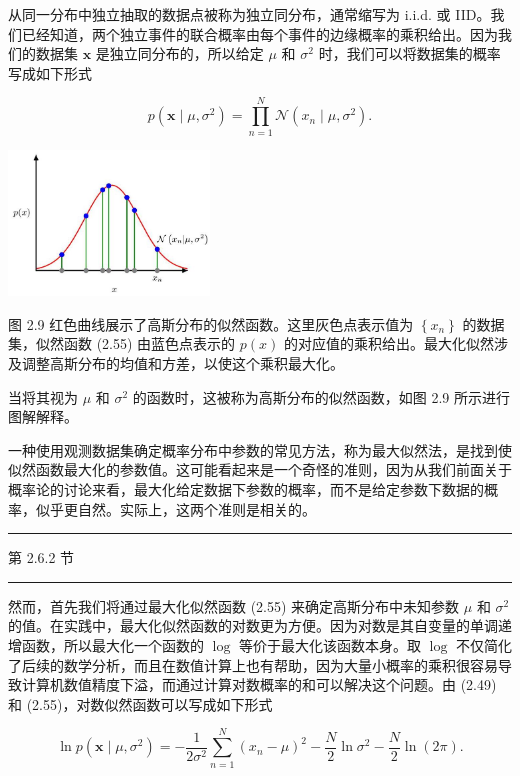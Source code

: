 \documentclass[10pt]{report}
\newcommand{\HRule}{\begin{center}\rule{0.9\linewidth}{0.2mm}\end{center}}
\begin{document}
从同一分布中独立抽取的数据点被称为独立同分布，通常缩写为 i.i.d. 或 IID。我们已经知道，两个独立事件的联合概率由每个事件的边缘概率的乘积给出。因为我们的数据集 \(\mathbf{x}\) 是独立同分布的，所以给定 \(\mu\) 和 \({\sigma }^{2}\) 时，我们可以将数据集的概率写成如下形式

\[
p\left( {\mathbf{x} \mid  \mu ,{\sigma }^{2}}\right)  = \mathop{\prod }\limits_{{n = 1}}^{N}\mathcal{N}\left( {{x}_{n} \mid  \mu ,{\sigma }^{2}}\right) . \tag{2.55}
\]

\begin{center}
\includegraphics[max width=0.4\textwidth]{images/0194e279-9b28-703a-88f4-c3ac21e2010d_57_941_344_607_442_0.jpg}
\end{center}
\hspace*{3em} 

图 2.9 红色曲线展示了高斯分布的似然函数。这里灰色点表示值为 \(\left\{  {x}_{n}\right\}\) 的数据集，似然函数 (2.55) 由蓝色点表示的 \(p\left( x\right)\) 的对应值的乘积给出。最大化似然涉及调整高斯分布的均值和方差，以使这个乘积最大化。

当将其视为 \(\mu\) 和 \({\sigma }^{2}\) 的函数时，这被称为高斯分布的似然函数，如图 2.9 所示进行图解解释。

一种使用观测数据集确定概率分布中参数的常见方法，称为最大似然法，是找到使似然函数最大化的参数值。这可能看起来是一个奇怪的准则，因为从我们前面关于概率论的讨论来看，最大化给定数据下参数的概率，而不是给定参数下数据的概率，似乎更自然。实际上，这两个准则是相关的。

\HRule

第 2.6.2 节

\HRule

然而，首先我们将通过最大化似然函数 (2.55) 来确定高斯分布中未知参数 \(\mu\) 和 \({\sigma }^{2}\) 的值。在实践中，最大化似然函数的对数更为方便。因为对数是其自变量的单调递增函数，所以最大化一个函数的 \(\log\) 等价于最大化该函数本身。取 \(\log\) 不仅简化了后续的数学分析，而且在数值计算上也有帮助，因为大量小概率的乘积很容易导致计算机数值精度下溢，而通过计算对数概率的和可以解决这个问题。由 (2.49) 和 (2.55)，对数似然函数可以写成如下形式

\[
\ln p\left( {\mathbf{x} \mid  \mu ,{\sigma }^{2}}\right)  =  - \frac{1}{2{\sigma }^{2}}\mathop{\sum }\limits_{{n = 1}}^{N}{\left( {x}_{n} - \mu \right) }^{2} - \frac{N}{2}\ln {\sigma }^{2} - \frac{N}{2}\ln \left( {2\pi }\right) . \tag{2.56}
\]
\end{document}
